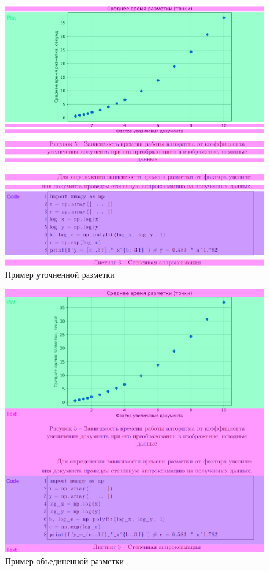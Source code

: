 \begin{figure}[H]
	\centering
	\includegraphics[width=\textwidth]{img/m.spec.png}
    \caption{Пример уточненной разметки}
	\label{fig:spec}
\end{figure}

\begin{figure}[H]
	\centering
	\includegraphics[width=\textwidth]{img/m.merged.png}
    \caption{Пример объединенной разметки}
	\label{fig:merged}
\end{figure}

